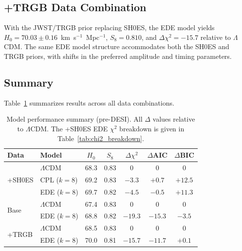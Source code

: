 \documentclass[a4paper,11pt]{article}
\begin{document}

\subsection{+TRGB Data Combination}
\label{sec:trgb_results}

With the JWST/TRGB prior replacing SH0ES, the EDE model yields $H_0 = 70.03 \pm 0.16$~km~s$^{-1}$~Mpc$^{-1}$, $S_8 = 0.810$, and $\Delta\chi^2 = -15.7$ relative to $\Lambda$CDM. The same EDE model structure accommodates both the SH0ES and TRGB priors, with shifts in the preferred amplitude and timing parameters.


\subsection{Summary}
\label{sec:summary_grid}

Table~\ref{tab:summary_grid} summarizes results across all data combinations.

\begin{table}[h]
\centering
\caption{Model performance summary (pre-DESI). All $\Delta$ values relative to $\Lambda$CDM. The +SH0ES EDE $\chi^2$ breakdown is given in Table~\ref{tab:chi2_breakdown}.}
\label{tab:summary_grid}
\begin{tabular}{llccccc}
\toprule
Data & Model & $H_0$ & $S_8$ & $\Delta\chi^2$ & $\Delta$AIC & $\Delta$BIC \\
\midrule
\multirow{3}{*}{+SH0ES} 
 & $\Lambda$CDM & 68.3 & 0.83 & 0 & 0 & 0 \\
 & CPL ($k=8$) & 69.2 & 0.83 & $-3.3$ & $+0.7$ & $+12.5$ \\
 & EDE ($k=8$) & 69.7 & 0.82 & $-4.5$ & $-0.5$ & $+11.3$ \\
\midrule
\multirow{2}{*}{Base} 
 & $\Lambda$CDM & 67.4 & 0.83 & 0 & 0 & 0 \\
 & EDE ($k=8$) & 68.8 & 0.82 & $-19.3$ & $-15.3$ & $-3.5$ \\
\midrule
\multirow{2}{*}{+TRGB} 
 & $\Lambda$CDM & 68.5 & 0.83 & 0 & 0 & 0 \\
 & EDE ($k=8$) & 70.0 & 0.81 & $-15.7$ & $-11.7$ & $+0.1$ \\
\bottomrule
\end{tabular}
\end{table}
\end{document}
